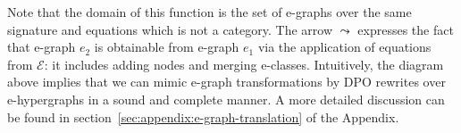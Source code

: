 Note that the domain of this function is the set of e-graphs over the same signature and equations which is not a category.
The arrow $\leadsto$ expresses the fact that e-graph $e_2$ is obtainable from e-graph $e_1$ via the application of equations from $\mathcal{E}$: it includes adding nodes and merging e-classes.
Intuitively, the diagram above implies that we can mimic e-graph transformations by DPO rewrites over e-hypergraphs in a sound and complete manner.
A more detailed discussion can be found in section~\ref{sec:appendix:e-graph-translation} of the Appendix.
